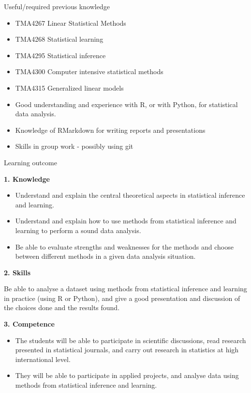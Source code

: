 \documentclass[
  ignorenonframetext,
]{beamer}
\providecommand{\tightlist}{%
  \setlength{\itemsep}{0pt}\setlength{\parskip}{0pt}}
\begin{document}
\begin{frame}{Useful/required previous knowledge}
\protect\hypertarget{usefulrequired-previous-knowledge}{}

\begin{itemize}
\tightlist
\item
  TMA4267 Linear Statistical Methods
\item
  TMA4268 Statistical learning
\item
  TMA4295 Statistical inference
\item
  TMA4300 Computer intensive statistical methods
\item
  TMA4315 Generalized linear models
\item
  Good understanding and experience with R, or with Python, for
  statistical data analysis.
\item
  Knowledge of RMarkdown for writing reports and presentations
\item
  Skills in group work - possibly using git
\end{itemize}

\end{frame}

\begin{frame}{Learning outcome}
\protect\hypertarget{learning-outcome}{}

\textbf{1. Knowledge}

\begin{itemize}
\tightlist
\item
  Understand and explain the central theoretical aspects in statistical
  inference and learning.
\item
  Understand and explain how to use methods from statistical inference
  and learning to perform a sound data analysis.
\item
  Be able to evaluate strengths and weaknesses for the methods and
  choose between different methods in a given data analysis situation.
\end{itemize}

\end{frame}

\begin{frame}

\textbf{2. Skills}

Be able to analyse a dataset using methods from statistical inference
and learning in practice (using R or Python), and give a good
presentation and discussion of the choices done and the results found.

\textbf{3. Competence}

\begin{itemize}
\tightlist
\item
  The students will be able to participate in scientific discussions,
  read research presented in statistical journals, and carry out
  research in statistics at high international level.
\item
  They will be able to participate in applied projects, and analyse data
  using methods from statistical inference and learning.
\end{itemize}

\end{frame}
\end{document}
